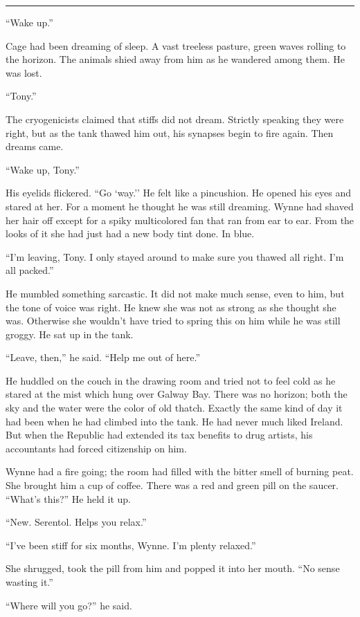 \fancybreak{* * *}

``Wake up.''

Cage had been dreaming of sleep. A vast treeless pasture, green waves rolling to the horizon. The animals shied away from him as he wandered among them. He was lost.

``Tony.''

The cryogenicists claimed that stiffs did not dream. Strictly speaking they were right, but as the tank thawed him out, his synapses begin to fire again. Then dreams came.

``Wake up, Tony.''

His eyelids flickered. ``Go `way.'' He felt like a pincushion. He opened his eyes and stared at her. For a moment he thought he was still dreaming. Wynne had shaved her hair off except for a spiky multicolored fan that ran from ear to ear. From the looks of it she had just had a new body tint done. In blue.

``I'm leaving, Tony. I only stayed around to make sure you thawed all right. I'm all packed.''

He mumbled something sarcastic. It did not make much sense, even to him, but the tone of voice was right. He knew she was not as strong as she thought she was. Otherwise she wouldn't have tried to spring this on him while he was still groggy. He sat up in the tank.

``Leave, then,'' he said. ``Help me out of here.''

He huddled on the couch in the drawing room and tried not to feel cold as he stared at the mist which hung over Galway Bay. There was no horizon; both the sky and the water were the color of old thatch. Exactly the same kind of day it had been when he had climbed into the tank. He had never much liked Ireland. But when the Republic had extended its tax benefits to drug artists, his accountants had forced citizenship on him.

Wynne had a fire going; the room had filled with the bitter smell of burning peat. She brought him a cup of coffee. There was a red and green pill on the saucer. ``What's this?'' He held it up.

``New. Serentol. Helps you relax.''

``I've been stiff for six months, Wynne. I'm plenty relaxed.''

She shrugged, took the pill from him and popped it into her mouth. ``No sense wasting it.''

``Where will you go?'' he said.

